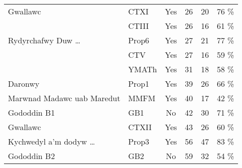 \begin{table}[h]
\begin{tabular}{@{}llcrrr@{}}
Gwallawc                          & CTXI           & Yes                                      & 26                                       & 20                                   & 76                                   \% \\
                                  & CTIII          & Yes                                      & 26                                       & 16                                   & 61                                   \% \\
Rydyrchafwy Duw \ldots & Prop6          & Yes                                      & 27                                       & 21                                   & 77                                   \% \\
                                  & CTV            & Yes                                      & 27                                       & 16                                   & 59                                   \% \\
                                  & YMATh          & Yes                                      & 31                                       & 18                                   & 58                                   \% \\
Daronwy                           & Prop1          & Yes                                      & 39                                       & 26                                   & 66                                   \% \\
Marwnad Madawc uab Maredut        & MMFM           & Yes                                      & 40                                       & 17                                   & 42                                   \% \\
Gododdin B1                       & GB1            & No                                     & 42                                       & 30                                   & 71                                   \% \\
Gwallawc                          & CTXII          & Yes                                      & 43                                       & 26                                   & 60                                   \% \\
Kychwedyl a'm dodyw \ldots  & Prop3          & Yes                                      & 56                                       & 47                                   & 83                                   \% \\
Gododdin B2                       & GB2            & No                                     & 59                                       & 32                                   & 54                                   \% \\

\end{tabular}
\end{table}
